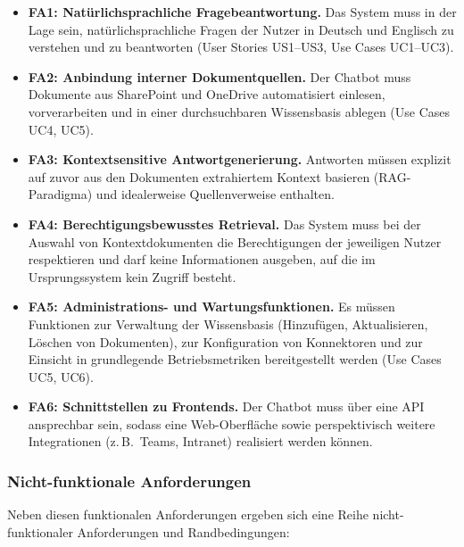 \begin{itemize}
    \item \textbf{FA1: Natürlichsprachliche Fragebeantwortung.}
    Das System muss in der Lage sein, natürlichsprachliche Fragen der Nutzer in Deutsch und Englisch zu verstehen und zu beantworten (User Stories US1--US3, Use Cases UC1--UC3).

    \item \textbf{FA2: Anbindung interner Dokumentquellen.}
    Der Chatbot muss Dokumente aus SharePoint und OneDrive automatisiert einlesen, vorverarbeiten und in einer durchsuchbaren Wissensbasis ablegen (Use Cases UC4, UC5).

    \item \textbf{FA3: Kontextsensitive Antwortgenerierung.}
    Antworten müssen explizit auf zuvor aus den Dokumenten extrahiertem Kontext basieren (RAG-Paradigma) und idealerweise Quellenverweise enthalten.

    \item \textbf{FA4: Berechtigungsbewusstes Retrieval.}
    Das System muss bei der Auswahl von Kontextdokumenten die Berechtigungen der jeweiligen Nutzer respektieren und darf keine Informationen ausgeben, auf die im Ursprungssystem kein Zugriff besteht.

    \item \textbf{FA5: Administrations- und Wartungsfunktionen.}
    Es müssen Funktionen zur Verwaltung der Wissensbasis (Hinzufügen, Aktualisieren, Löschen von Dokumenten), zur Konfiguration von Konnektoren und zur Einsicht in grundlegende Betriebsmetriken bereitgestellt werden (Use Cases UC5, UC6).

    \item \textbf{FA6: Schnittstellen zu Frontends.}
    Der Chatbot muss über eine API ansprechbar sein, sodass eine Web-Oberfläche sowie perspektivisch weitere Integrationen (z.\,B.\ Teams, Intranet) realisiert werden können.
\end{itemize}

\subsubsection{Nicht-funktionale Anforderungen}

Neben diesen funktionalen Anforderungen ergeben sich eine Reihe nicht-funktionaler Anforderungen und Randbedingungen:

